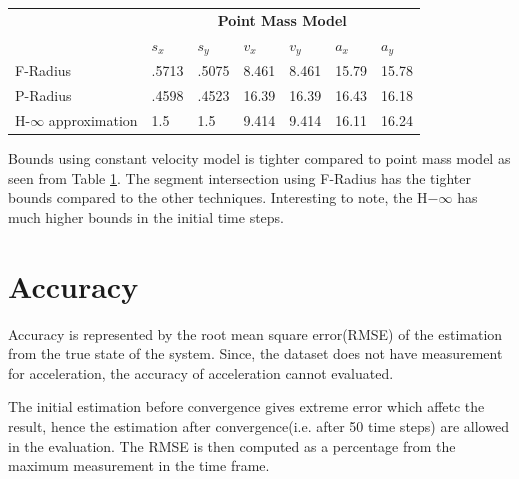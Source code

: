\begin{table}[htbp]
\begin{tabular}{l l l l l l l}
		& \multicolumn{6}{c}{\textbf{Point Mass Model}}\\
		 & \textbf{$s_x$} & \textbf{$s_y$} & \textbf{$v_x$} & \textbf{$v_y$} & \textbf{$a_x$} & \textbf{$a_y$}\\ \midrule
		F-Radius & .5713 &	.5075 &	8.461	& 8.461 &	15.79 &	15.78\\
		P-Radius & .4598 &	.4523 &	16.39 &	16.39 &	16.43 &	16.18\\
		H-$\infty$ approximation & 1.5 & 1.5 & 9.414 &	9.414 &	16.11 &	16.24\\
		\bottomrule
	\end{tabular}
	\label{tab:bound}
\end{table}
Bounds using constant velocity model is tighter compared to point mass model as seen from Table \ref{tab:bound}. The segment intersection using F-Radius has the tighter bounds compared to the other techniques. Interesting to note, the H$-\infty$ has much higher bounds in the initial time steps.


\section{Accuracy}
Accuracy is represented by the root mean square error(RMSE) of the estimation from the true state of the system. Since, the dataset does not have measurement for acceleration, the accuracy of acceleration cannot evaluated.

The initial estimation before convergence gives extreme error which affetc the result, hence the estimation after convergence(i.e. after 50 time steps) are allowed in the evaluation. The RMSE is then computed as a percentage from the maximum measurement in the time frame.

